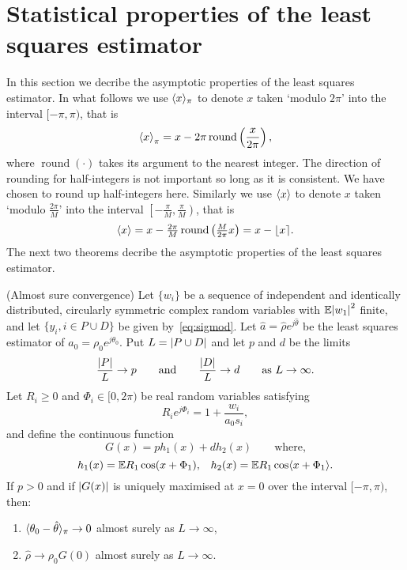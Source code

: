 \documentclass[journal]{IEEEtran}
\begin{document}
\section{Statistical properties of the least squares estimator}\label{sec:stat-prop-least}

In this section we decribe the asymptotic properties of the least squares estimator.  In what follows we use $\langle x \rangle_\pi$ to denote $x$ taken `modulo $2\pi$' into the interval $[-\pi, \pi)$, that is
\[
\left\langle x \right\rangle_\pi = x - 2\pi\operatorname{round}\left(\frac{x}{2\pi}\right),
\]
where $\operatorname{round}(\cdot)$ takes its argument to the nearest integer.  The direction of rounding for half-integers is not important so long as it is consistent.  We have chosen to round up half-integers here.  Similarly we use $\langle x \rangle$ to denote $x$ taken `modulo $\tfrac{2\pi}{M}$' into the interval $\left[-\tfrac{\pi}{M}, \tfrac{\pi}{M}\right)$, that is
\[
\left\langle x \right\rangle = x - \tfrac{2\pi}{M}\operatorname{round}\left(\tfrac{M}{2\pi}x\right) = x - {\left\lfloor x \right\rceil}.
\]
The next two theorems decribe the asymptotic properties of the least squares estimator.

\begin{theorem}\label{thm:consistency} (Almost sure convergence)
Let $\{w_i\}$ be a sequence of independent and identically distributed, circularly symmetric complex random variables with ${\mathbb E} {\left\vert w_1 \right\vert}^2$ finite, and let $\{y_i, i \in P \cup D\}$ be given by~\eqref{eq:sigmod}.   Let $\hat{a} = \hat{\rho}e^{j\hat{\theta}}$ be the least squares estimator of $a_0 = \rho_0e^{j\theta_0}$. %
Put $L = {\left\vert P \cup D \right\vert}$ and let $p$ and $d$ be the limits
\[
\frac{{\left\vert P \right\vert}}{L} \rightarrow p \qquad \text{and} \qquad \frac{{\left\vert D \right\vert}}{L} \rightarrow d \qquad \text{as $L \rightarrow \infty$.}
\] 
Let $R_i \geq 0$ and $\Phi_i \in [0,2\pi)$ be real random variables satisfying
\begin{equation}\label{eq:RiandPhii}
R_ie^{j\Phi_i} = 1 + \frac{w_i}{a_0 s_i} ,
\end{equation}
and define the continuous function
\[
G(x) = p h_1(x) + d h_2(x) \qquad \text{where,}
\]
\[
h_1(x) = {\mathbb E} R_1 \cos(x + \Phi_1), \;\;\; h_2(x) =  {\mathbb E} R_1 \cos\langle  x + \Phi_1 \rangle.
\]
If $p > 0$ and if ${\left\vert G(x) \right\vert}$ is uniquely maximised at $x = 0$ over the interval $[-\pi,\pi)$, then:
\begin{enumerate}
\item $\langle \theta_0 - \hat{\theta} \rangle_\pi \rightarrow 0$ almost surely as $L \rightarrow \infty$,
\item $\hat{\rho} \rightarrow \rho_0 G(0)$ almost surely as $L \rightarrow \infty$.
\end{enumerate}
\end{theorem}
\end{document}

